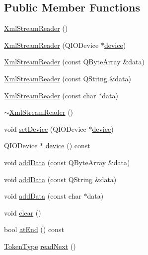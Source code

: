 \subsection*{Public Member Functions}
\begin{DoxyCompactItemize}
\item 
\hyperlink{class_xml_stream_reader_ac25232b146a8737e6735544116fb703d}{Xml\+Stream\+Reader} ()
\item 
\hyperlink{class_xml_stream_reader_a21d81e0a48fc957b40b7b735ab4c2b10}{Xml\+Stream\+Reader} (Q\+I\+O\+Device $\ast$\hyperlink{class_xml_stream_reader_aa2a751d1b36fac13138b2f370683dfe7}{device})
\item 
\hyperlink{class_xml_stream_reader_a5e3dd56e92748dcb914a1d4444ec58dc}{Xml\+Stream\+Reader} (const Q\+Byte\+Array \&data)
\item 
\hyperlink{class_xml_stream_reader_adf9a5f6b6a076f53e62d5c414139f5dd}{Xml\+Stream\+Reader} (const Q\+String \&data)
\item 
\hyperlink{class_xml_stream_reader_ab8374c8328df1023e4274b780caefea3}{Xml\+Stream\+Reader} (const char $\ast$data)
\item 
\hyperlink{class_xml_stream_reader_ae1ee1ea88f07303fa7a25d9c800d646a}{$\sim$\+Xml\+Stream\+Reader} ()
\item 
void \hyperlink{class_xml_stream_reader_a0d166c5c7814d44a0015a82f0500cee5}{set\+Device} (Q\+I\+O\+Device $\ast$\hyperlink{class_xml_stream_reader_aa2a751d1b36fac13138b2f370683dfe7}{device})
\item 
Q\+I\+O\+Device $\ast$ \hyperlink{class_xml_stream_reader_aa2a751d1b36fac13138b2f370683dfe7}{device} () const
\item 
void \hyperlink{class_xml_stream_reader_add6baa0f8790fc528c1fa6e05755f96b}{add\+Data} (const Q\+Byte\+Array \&data)
\item 
void \hyperlink{class_xml_stream_reader_ac998bbe2fc600172e2d780a58708f358}{add\+Data} (const Q\+String \&data)
\item 
void \hyperlink{class_xml_stream_reader_a4dc8d02a038a0b16e6a47f5d2a36d8a3}{add\+Data} (const char $\ast$data)
\item 
void \hyperlink{class_xml_stream_reader_a2a67f5a1fff83d33214ccc9ec9494ca0}{clear} ()
\item 
bool \hyperlink{class_xml_stream_reader_a4acf0ba0ea25300b66c9d85ba3e8dfb3}{at\+End} () const
\item 
\hyperlink{class_xml_stream_reader_a99e2023f874f0ca648c996ae79c3b5f7}{Token\+Type} \hyperlink{class_xml_stream_reader_adb18e6f9842e9b470cde16385732ad84}{read\+Next} ()

\end{DoxyCompactItemize}
